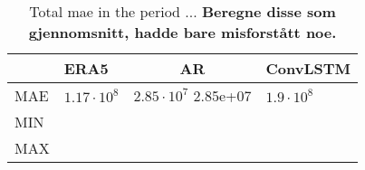 \begin{table}[]
    \centering
    \begin{tabular}{llll}
    \multicolumn{1}{c}{\textbf{}} & \textbf{ERA5} & \multicolumn{1}{c}{\textbf{AR}} & \multicolumn{1}{c}{\textbf{ConvLSTM}} \\ \hline
    MAE & $1.17\cdot10^8$ & $2.85\cdot10^7$ 2.85e+07 & $1.9 \cdot 10^8$  \\ \hline
    MIN & & & & \\ \hline
    MAX & & & & \\ \hline
    \end{tabular}
    \caption{Total \acrfull{mae} in the period ... \textbf{Beregne disse som gjennomsnitt, hadde bare misforstått noe.}}
    \label{tab:tot_mae_score}
\end{table}